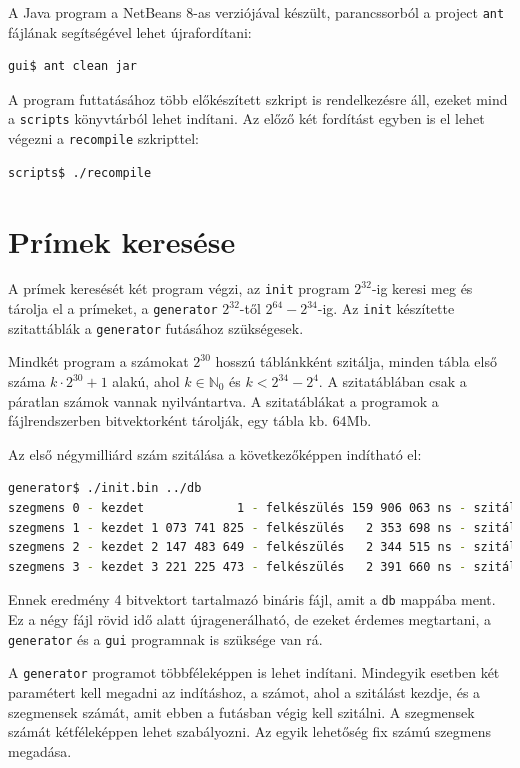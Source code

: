 A Java program a NetBeans 8-as verziójával készült,
parancssorból a project \texttt{ant} fájlának segítségével lehet újrafordítani:
\begin{lstlisting}[language=bash]
gui$ ant clean jar
\end{lstlisting}

A program futtatásához több előkészített szkript is rendelkezésre áll, ezeket mind a \texttt{scripts} könyvtárból lehet indítani.
Az előző két fordítást egyben is el lehet végezni a \texttt{recompile} szkripttel:
\begin{lstlisting}[language=bash]
scripts$ ./recompile
\end{lstlisting}

\section{Prímek keresése}

A prímek keresését két program végzi, az \texttt{init} program $2^{32}$-ig keresi meg és tárolja el a prímeket, a \texttt{generator} $2^{32}$-től $2^{64}-2^{34}$-ig.
Az \texttt{init} készítette szitattáblák a \texttt{generator} futásához szükségesek.

Mindkét program a számokat $2^{30}$ hosszú táblánkként szitálja, minden tábla első száma $k \cdot 2^{30}+1$ alakú, ahol $k \in \mathbb{N}_0$ és $k < 2^{34}-2^{4}$.
A szitatáblában csak a páratlan számok vannak nyilvántartva.
A szitatáblákat a programok a fájlrendszerben bitvektorként tárolják, egy tábla kb. $64$Mb.

Az első négymilliárd szám szitálása a következőképpen indítható el:
\begin{lstlisting}[language=bash]
generator$ ./init.bin ../db
szegmens 0 - kezdet             1 - felkészülés 159 906 063 ns - szitálás 1 122 878 403 ns
szegmens 1 - kezdet 1 073 741 825 - felkészülés   2 353 698 ns - szitálás 1 171 101 336 ns
szegmens 2 - kezdet 2 147 483 649 - felkészülés   2 344 515 ns - szitálás 1 188 330 478 ns
szegmens 3 - kezdet 3 221 225 473 - felkészülés   2 391 660 ns - szitálás 1 199 900 603 ns
\end{lstlisting}
Ennek eredmény 4 bitvektort tartalmazó bináris fájl, amit a \texttt{db} mappába ment.
Ez a négy fájl rövid idő alatt újragenerálható, de ezeket érdemes megtartani, a \texttt{generator} és a \texttt{gui} programnak is szüksége van rá.

A \texttt{generator} programot többféleképpen is lehet indítani.
Mindegyik esetben két paramétert kell megadni az indításhoz, a számot, ahol a szitálást kezdje, és a szegmensek számát, amit ebben a futásban végig kell szitálni.
A szegmensek számát kétféleképpen lehet szabályozni.
Az egyik lehetőség fix számú szegmens megadása.

